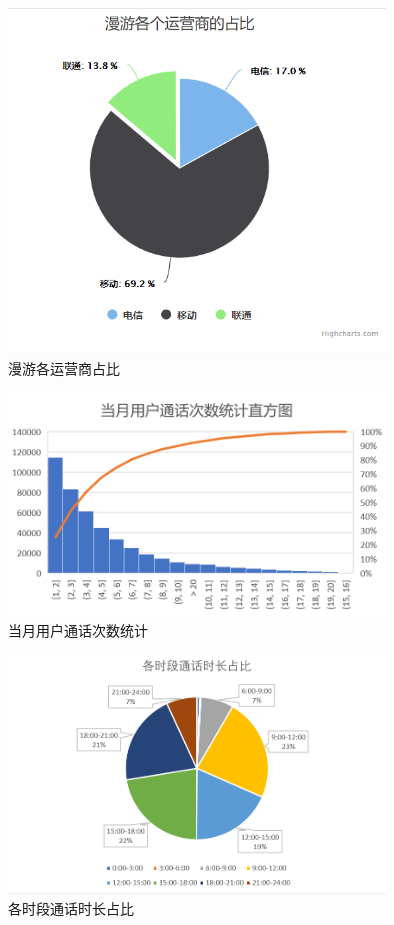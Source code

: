 \documentclass[12pt,a4paper]{article}
\begin{document}
\begin{figure}[htb]
\centering
\includegraphics[width=10cm]{computing_result_3}
\caption{漫游各运营商占比 \label{computing_result_3}}
\end{figure}
\begin{figure}[htb]
\centering
\includegraphics[width=10cm]{month_num}
\caption{当月用户通话次数统计 \label{month_num}}
\end{figure}
\begin{figure}[htb]
\centering
\includegraphics[width=10cm]{duration_distribution}
\caption{各时段通话时长占比 \label{duration_distribution}}
\end{figure}
\end{document}
